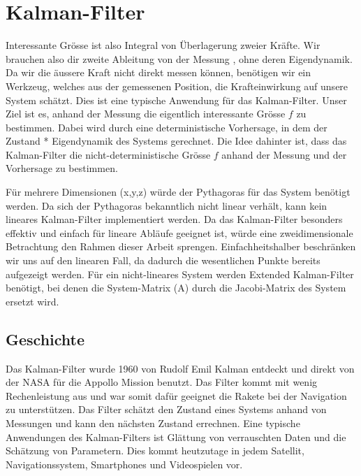 %
%
%
%
%




\section{Kalman-Filter}
Interessante Grösse ist also Integral von Überlagerung zweier Kräfte. 
Wir brauchen also dir zweite Ableitung von der Messung , ohne deren Eigendynamik.
Da wir die äussere Kraft nicht direkt messen können, benötigen wir ein Werkzeug, welches aus der gemessenen Position, die Krafteinwirkung auf unsere System schätzt. 
Dies ist eine typische Anwendung für das Kalman-Filter.
Unser Ziel ist es, anhand der Messung die eigentlich interessante Grösse $f$ zu bestimmen. 
Dabei wird durch eine deterministische Vorhersage, in dem der Zustand * Eigendynamik des Systems gerechnet. 
Die Idee dahinter ist, dass das Kalman-Filter die nicht-deterministische Grösse $f$ anhand der Messung und der Vorhersage zu bestimmen.

Für mehrere Dimensionen (x,y,z) würde der Pythagoras für das System benötigt werden.
Da sich der Pythagoras bekanntlich nicht linear verhält, kann kein lineares Kalman-Filter implementiert werden. 
Da das Kalman-Filter besonders effektiv und einfach für lineare Abläufe geeignet ist, würde eine zweidimensionale Betrachtung den Rahmen dieser Arbeit sprengen. 
Einfachheitshalber beschränken wir uns auf den linearen Fall, da dadurch die wesentlichen Punkte bereits aufgezeigt werden. 
Für ein nicht-lineares System werden Extended Kalman-Filter benötigt, bei denen die System-Matrix (A) durch die Jacobi-Matrix des System ersetzt wird.

\subsection{Geschichte}
Das Kalman-Filter wurde 1960 von Rudolf Emil Kalman entdeckt und direkt von der NASA für die Appollo Mission benutzt.
Das Filter kommt mit wenig Rechenleistung aus und war somit dafür geeignet die Rakete bei der Navigation zu unterstützen. 
Das Filter schätzt den Zustand eines Systems anhand von Messungen und kann den nächsten Zustand errechnen. Eine typische Anwendungen des Kalman-Filters ist Glättung von verrauschten Daten und die Schätzung von Parametern. Dies kommt heutzutage in jedem Satellit, Navigationssystem, Smartphones und Videospielen vor.


